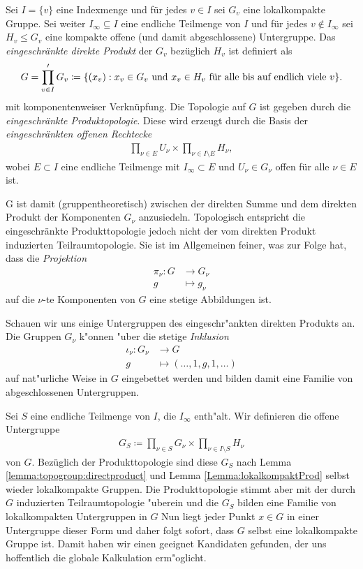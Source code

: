 		\begin{defi}
			Sei $I=\{v\}$ eine Indexmenge und für jedes $v \in I$ sei $G_v$ eine lokalkompakte Gruppe. 
			Sei weiter $I_\infty \subseteq I$ eine endliche Teilmenge von $I$ und für jedes $v \notin I_\infty$ sei $H_v\leq G_v$ eine kompakte offene (und damit abgeschlossene) Untergruppe. 
			Das \emph{eingeschränkte direkte Produkt} der $G_v$ bezüglich $H_v$ ist definiert als 
			\begin{align*}
				G = \prod\limits_{v \in I}' G_v \coloneqq  \{ (x_v): x_v \in G_v \text{ und } x_v \in H_v \text{ für alle bis auf endlich viele } v \}.
			\end{align*}
			mit komponentenweiser Verknüpfung. Die Topologie auf $G$ ist gegeben durch die \emph{eingeschränkte Produktopologie}. 
			Diese wird erzeugt durch die Basis der \emph{eingeschränkten offenen Rechtecke}
			\begin{align*}
				\prod_{\nu\in E} U_\nu \times \prod_{\nu\in I\setminus E} H_\nu,
			\end{align*}
			wobei $E \subset I$ eine endliche Teilmenge mit $I_\infty \subset E$ und $U_\nu \in G_\nu$ offen für alle $\nu\in E$ ist.
		\end{defi}
		G ist damit (gruppentheoretisch) zwischen der direkten Summe und dem direkten Produkt der Komponenten $G_\nu$ anzusiedeln.
		Topologisch entspricht die eingeschränkte Produkttopologie jedoch nicht der vom direkten Produkt induzierten Teilraumtopologie.
		Sie ist im Allgemeinen feiner, was zur Folge hat, dass die \emph{Projektion}
		\begin{align*}
			\pi_\nu: G &\to G_\nu\\
					g&\mapsto g_\nu
		\end{align*}
		auf die $\nu$-te Komponenten von $G$ eine stetige Abbildungen ist.
		
		Schauen wir uns einige Untergruppen des eingeschr"ankten direkten Produkts an.
		Die Gruppen $G_\nu$ k"onnen "uber die stetige \emph{Inklusion} 
		\begin{align*}
			\iota_\nu: G_\nu &\to G \\
					g &\mapsto (\dots,1,g,1,\dots)
		\end{align*}
		auf nat"urliche Weise in $G$ eingebettet werden und bilden damit eine Familie von abgeschlossenen Untergruppen.
		
		Sei $S$ eine endliche Teilmenge von $I$, die $I_\infty$ enth"alt. 
		Wir definieren die offene Untergruppe
		\begin{align*}
			G_S \coloneqq  \prod_{\nu\in S}G_\nu \times \prod_{\nu\in I\setminus S} H_\nu
		\end{align*}
		von $G$. 
		Bezüglich der Produkttopologie sind diese $G_S$ nach Lemma \ref{lemma:topogroup:directproduct} und Lemma \ref{Lemma:lokalkompaktProd} selbst wieder lokalkompakte Gruppen.
		Die Produkttopologie stimmt aber mit der durch $G$ induzierten Teilraumtopologie "uberein und die $G_S$ bilden eine Familie von lokalkompakten Untergruppen in $G$
		Nun liegt jeder Punkt $x \in G$ in einer Untergruppe dieser Form und daher folgt sofort, dass $G$ selbst eine lokalkompakte Gruppe ist.
		Damit haben wir einen geeignet Kandidaten gefunden, der uns hoffentlich die globale Kalkulation erm"oglicht.
		
